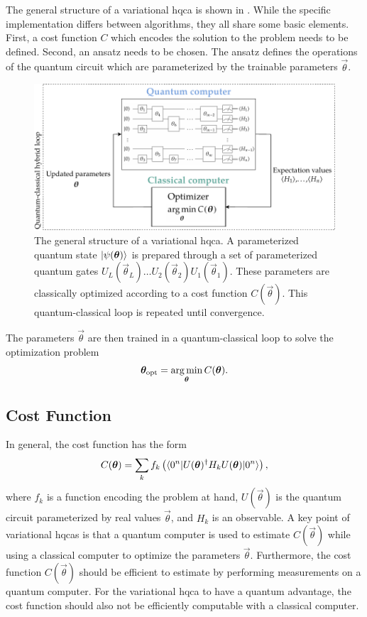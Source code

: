 The general structure of a variational \gls{hqca} is shown in .
While the specific implementation differs between algorithms, they all share some basic elements.
First, a cost function $C$ which encodes the solution to the problem needs to be defined.
Second, an ansatz needs to be chosen.
The ansatz defines the operations of the quantum circuit which are parameterized by the trainable parameters $\vec{\theta}$.
\begin{figure}[ht]
    \centering
    \includegraphics[width=1\linewidth]{figures/vqa-general-structure.pdf}
    \caption[The general structure of a variational \acrshort{hqca}.]{
        The general structure of a variational \gls{hqca}.
        A parameterized quantum state $\vert{\psi(\bm{\theta})}\rangle$ is prepared through a set of parameterized quantum gates $U_L(\vec{\theta}_L) \ldots U_2(\vec{\theta}_2)U_1(\vec{\theta}_1)$.
        These parameters are classically optimized according to a cost function $C(\vec{\theta})$.
        This quantum-classical loop is repeated until convergence.
    }
    \label{fig:vqa-general-structure}
\end{figure}
The parameters $\vec{\theta}$ are then trained in a quantum-classical loop to solve the optimization problem
\begin{equation} \label{eqn:optimization-problem}
\bm{\theta}_\text{opt} = \operatorname*{arg\,min}_{\bm{\theta}} C(\bm{\theta}).
\end{equation}

\subsection{Cost Function}
In general, the cost function has the form
\begin{equation} \label{eqn:general-cost-function}
C(\bm{\theta}) = \sum_k f_k\left(\langle{0^n}\vert U(\bm{\theta})^\dagger H_k U(\bm{\theta})\vert{0^n}\rangle\right),
\end{equation}
where $f_k$ is a function encoding the problem at hand, $U(\vec{\theta})$ is the quantum circuit parameterized by real values $\vec{\theta}$, and $H_k$ is an observable.
A key point of variational \glspl{hqca} is that a quantum computer is used to estimate $C(\vec{\theta})$ while using a classical computer to optimize the parameters $\vec{\theta}$.
Furthermore, the cost function $C(\vec{\theta})$ should be efficient to estimate by performing measurements on a quantum computer.
For the variational \gls{hqca} to have a quantum advantage, the cost function should also not be efficiently computable with a classical computer.

